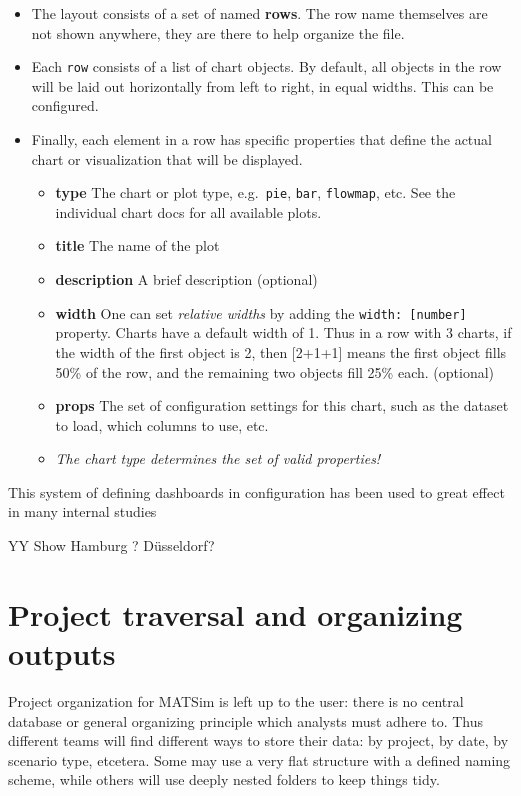 \begin{itemize}
\item
  The layout consists of a set of named \textbf{rows}. The row name
  themselves are not shown anywhere, they are there to help organize the
  file.
\item
  Each \texttt{row} consists of a list of chart objects. By default, all
  objects in the row will be laid out horizontally from left to right,
  in equal widths. This can be configured.
\item
  Finally, each element in a row has specific properties that define the
  actual chart or visualization that will be displayed.

  \begin{itemize}
  \item
    \textbf{type} The chart or plot type, e.g.~\texttt{pie},
    \texttt{bar}, \texttt{flowmap}, etc. See the individual chart docs
    for all available plots.
  \item
    \textbf{title} The name of the plot
  \item
    \textbf{description} A brief description (optional)
  \item
    \textbf{width} One can set \emph{relative widths} by adding the
    \texttt{width:\ {[}number{]}} property. Charts have a default width
    of 1. Thus in a row with 3 charts, if the width of the first object
    is 2, then {[}2+1+1{]} means the first object fills 50\% of the row,
    and the remaining two objects fill 25\% each. (optional)
  \item
    \textbf{props} The set of configuration settings for this chart,
    such as the dataset to load, which columns to use, etc.
  \item
    \emph{The chart type determines the set of valid properties!}
  \end{itemize}
\end{itemize}

This system of defining dashboards in configuration has been used to
great effect in many internal studies

YY Show Hamburg ? Düsseldorf?

\hypertarget{project-traversal-and-organizing-outputs}{%
\section{Project traversal and organizing
outputs}\label{project-traversal-and-organizing-outputs}}

Project organization for MATSim is left up to the user: there is no
central database or general organizing principle which analysts must
adhere to. Thus different teams will find different ways to store their
data: by project, by date, by scenario type, etcetera. Some may use a
very flat structure with a defined naming scheme, while others will use
deeply nested folders to keep things tidy.

